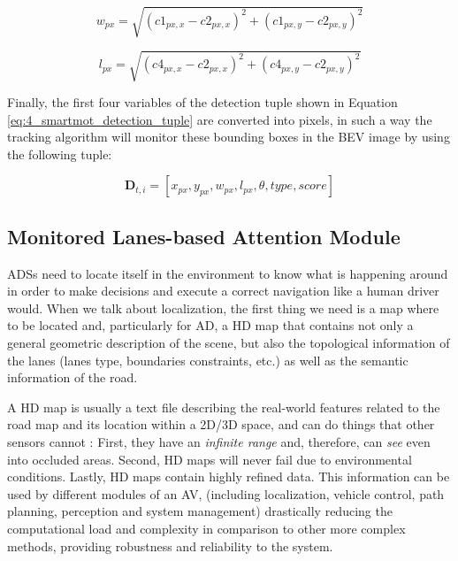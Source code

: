 \begin{equation}
\label{widthpixels}
w_{px} = \sqrt{(c1_{px,x}-c2_{px,x})^2 + (c1_{px,y}-c2_{px,y})^2}
\end{equation}

\begin{equation}
\label{lengthpixels}
l_{px} = \sqrt{(c4_{px,x}-c2_{px,x})^2 + (c4_{px,y}-c2_{px,y})^2}
\end{equation}

Finally, the first four variables of the detection tuple shown in Equation \ref{eq:4_smartmot_detection_tuple} are converted into pixels, in such a way the tracking algorithm will monitor these bounding boxes in the BEV image by using the following tuple:

\begin{equation}
	\label{detpx}
	\textbf{D}_{t,i} = [x_{px},y_{px},w_{px},l_{px},\theta,type,score]
\end{equation}

\subsection{Monitored Lanes-based Attention Module}
\label{subsec:4_smartmot_mlam}

\acp{ADS} need to locate itself in the environment to know what is happening around in order to make decisions and execute a correct navigation like a human driver would. When we talk about localization, the first thing we need is a map where to be located and, particularly for \ac{AD}, a HD map that contains not only a general geometric description of the scene, but also the topological information of the lanes (lanes type, boundaries constraints, etc.) as well as the semantic information of the road. 

A HD map is usually a text file describing the real-world features related to the road map and its location within a 2D/3D space, and can do things that other sensors cannot \cite{wong2020mapping}: First, they have an \textit{infinite range} and, therefore, can \textit{see} even into occluded areas. Second, HD maps will never fail due to environmental conditions. Lastly, HD maps contain highly refined data. This information can be used by different modules of an AV, (including localization, vehicle control, path planning, perception and system management) drastically reducing the computational load and complexity in comparison to other more complex methods, providing robustness and reliability to the system.

